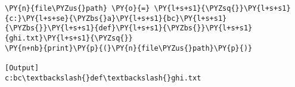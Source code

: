 \begin{Verbatim}[label=\makebox{\href{https://github.com/unipi-physics-labs/statnotes/tree/main/snippy/dos_path_escape.py}{https://github.com/.../dos\_path\_escape.py}},commandchars=\\\{\}]
\PY{n}{file\PYZus{}path} \PY{o}{=} \PY{l+s+s1}{\PYZsq{}}\PY{l+s+s1}{c:}\PY{l+s+se}{\PYZbs{}a}\PY{l+s+s1}{bc}\PY{l+s+s1}{\PYZbs{}}\PY{l+s+s1}{def}\PY{l+s+s1}{\PYZbs{}}\PY{l+s+s1}{ghi.txt}\PY{l+s+s1}{\PYZsq{}}
\PY{n+nb}{print}\PY{p}{(}\PY{n}{file\PYZus{}path}\PY{p}{)}

[Output]
c:bc\textbackslash{}def\textbackslash{}ghi.txt
\end{Verbatim}
